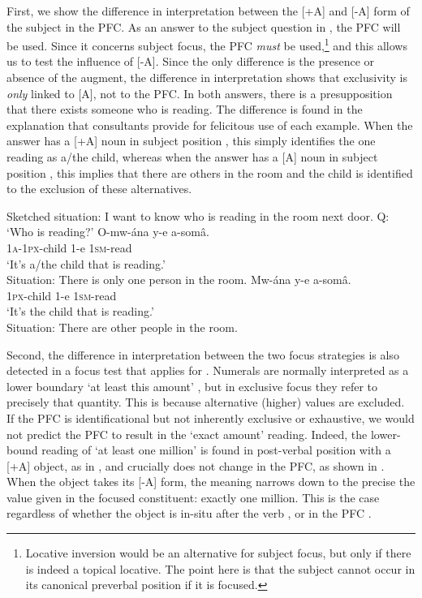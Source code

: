 \documentclass[output=paper]{langsci/langscibook}
\begin{document}
  First, we show the difference in interpretation between the [+A] and [-A] form of the subject in the PFC. As an answer to the subject question in , the PFC will be used. Since it concerns subject focus, the PFC \textit{must} be used,\footnote{Locative inversion would be an alternative for subject focus, but only if there is indeed a topical locative. The point here is that the subject cannot occur in its canonical preverbal position if it is focused.} and this allows us to test the influence of [-A]. Since the only difference is the presence or absence of the augment, the difference in interpretation shows that exclusivity is \textit{only} linked to [A], not to the PFC. In both answers, there is a presupposition that there exists someone who is reading. The difference is found in the explanation that consultants provide for felicitous use of each example. When the answer has a [+A] noun in subject position , this simply identifies the one reading as a/the child, whereas when the answer has a [A] noun in subject position , this implies that there are others in the room and the child is identified to the exclusion of these alternatives.

\ea\label{ex:vanderwal:39}
{Sketched situation: I want to know who is reading in the room next door.}
\glt   Q: ‘Who is reading?’
\ea\label{ex:vanderwal:39a}
\gll    O-mw-ána  y-e  a-somâ.\\
         \textsc{1a}-\textsc{1px}-child  1-e  \textsc{1sm}-read\\
\glt     ‘It’s a/the child that is reading.’\\
Situation: There is only one person in the room.
\ex\label{ex:vanderwal:39b}
\gll    Mw-ána  y-e  a-somâ.\\
         \textsc{1px}-child  1-e  \textsc{1sm}-read\\
\glt   ‘It’s the child that is reading.’\\
Situation: There are other people in the room.
\z
\z

Second, the difference in interpretation between the two focus strategies is also detected in a focus test that \citet{Kiss2009} applies for . Numerals are normally interpreted as a lower boundary ‘at least this amount’ \citep{Horn1972,Levinson2000}, but in exclusive focus they refer to precisely that quantity. This is because alternative (higher) values are excluded. If the PFC is identificational but not inherently exclusive or exhaustive, we would not predict the PFC to result in the ‘exact amount’ reading. Indeed, the lower-bound reading of ‘at least one million’ is found in post-verbal position with a [+A] object, as in , and crucially does not change in the PFC, as shown in . When the object takes its [-A] form, the meaning narrows down to the precise the value given in the focused constituent: exactly one million. This is the case regardless of whether the object is in-situ after the verb , or in the PFC .
\end{document}
